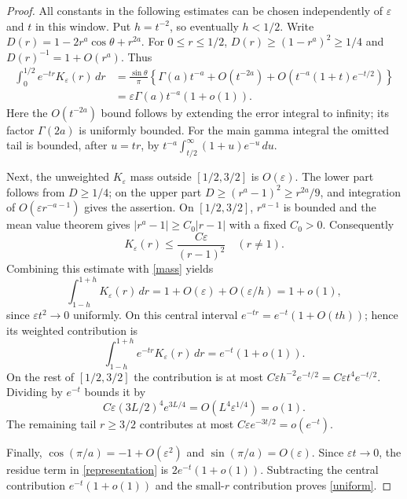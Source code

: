 \documentclass[11pt]{article}
\begin{document}
\begin{proof}
All constants in the following estimates can be chosen independently
of $\varepsilon$ and $t$ in this window. Put $h=t^{-2}$, so eventually
$h<1/2$. Write $D(r)=1-2r^a\cos\theta+r^{2a}$.
For $0\leq r\leq1/2$, $D(r)\geq(1-r^a)^2\geq1/4$ and
$D(r)^{-1}=1+O(r^a)$. Thus
\begin{align*}
 \int_0^{1/2}e^{-tr}K_\varepsilon(r)\,dr
 &=\frac{\sin\theta}{\pi}
   \left\{\Gamma(a)t^{-a}
       +O(t^{-2a})+O(t^{-a}(1+t)e^{-t/2})\right\}\\
 &=\varepsilon\Gamma(a)t^{-a}(1+o(1)).
\end{align*}
Here the $O(t^{-2a})$ bound follows by extending the error integral
to infinity; its factor $\Gamma(2a)$ is uniformly bounded. For the
main gamma integral the omitted tail is bounded, after $u=tr$, by
$t^{-a}\int_{t/2}^{\infty}(1+u)e^{-u}\,du$.

Next, the unweighted $K_\varepsilon$ mass outside $[1/2,3/2]$ is
$O(\varepsilon)$. The lower part follows from $D\geq1/4$; on the
upper part $D\geq(r^a-1)^2\geq r^{2a}/9$, and integration of
$O(\varepsilon r^{-a-1})$ gives the assertion. On $[1/2,3/2]$,
$r^{a-1}$ is bounded and the mean value theorem gives
$|r^a-1|\geq C_0|r-1|$ with a fixed $C_0>0$. Consequently
\[
 K_\varepsilon(r)\leq
            \frac{C\varepsilon}{(r-1)^2}\quad(r\ne1).
\]
Combining this estimate with \eqref{mass} yields
\[
 \int_{1-h}^{1+h}K_\varepsilon(r)\,dr
 =1+O(\varepsilon)+O(\varepsilon/h)=1+o(1),
\]
since $\varepsilon t^2\to0$ uniformly. On this central interval
$e^{-tr}=e^{-t}(1+O(th))$; hence its weighted contribution is
\[
 \int_{1-h}^{1+h}e^{-tr}K_\varepsilon(r)\,dr
 =e^{-t}(1+o(1)).
\]
On the rest of $[1/2,3/2]$ the contribution is at most
$C\varepsilon h^{-2}e^{-t/2}=C\varepsilon t^4e^{-t/2}$.
Dividing by $e^{-t}$ bounds it by
\[
 C\varepsilon(3L/2)^4 e^{3L/4}=O(L^4\varepsilon^{1/4})=o(1).
\]
The remaining tail $r\geq3/2$ contributes at most
$C\varepsilon e^{-3t/2}=o(e^{-t})$.

Finally, $\cos(\pi/a)=-1+O(\varepsilon^2)$ and
$\sin(\pi/a)=O(\varepsilon)$. Since $\varepsilon t\to0$,
the residue term in \eqref{representation} is $2e^{-t}(1+o(1))$.
Subtracting the central contribution $e^{-t}(1+o(1))$ and the
small-$r$ contribution proves \eqref{uniform}.
\end{proof}
\end{document}
